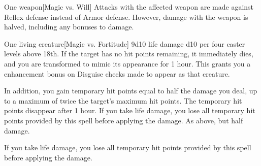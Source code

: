 \begin{spellheader}
\end{spellheader}
\begin{spelleffects}
    \spellrng{\rngtouch}
    \spelldur{\rngclose}
    \begin{spelltarget}{One weapon}[Magic vs. Will]
        \spellsuccess Attacks with the affected weapon are made against Reflex defense instead of Armor defense. However, damage with the weapon is halved, including any bonuses to damage.
    \end{spelltarget}
\end{spelleffects}

\begin{spellheader}
\end{spellheader}
\begin{spelleffects}
    \spellrng{\rngclose}
    \begin{spelltarget}{One living creature}[Magic vs. Fortitude]
        \spellsuccess 9d10 life damage \add d10 per four caster levels above 18th. If the target has no hit points remaining, it immediately dies, and you are transformed to mimic its appearance for 1 hour. This grants you a  enhancement bonus on Disguise checks made to appear as that creature.

        In addition, you gain temporary hit points equal to half the damage you deal, up to a maximum of twice the target's maximum hit points. The temporary hit points disappear after 1 hour. If you take life damage, you lose all temporary hit points provided by this spell before applying the damage.
        \spellfailure As above, but half damage.
    \end{spelltarget}
\end{spelleffects}
\begin{spellfooter}
    \spellnotes If you take life damage, you lose all temporary hit points provided by this spell before applying the damage.
\end{spellfooter}

